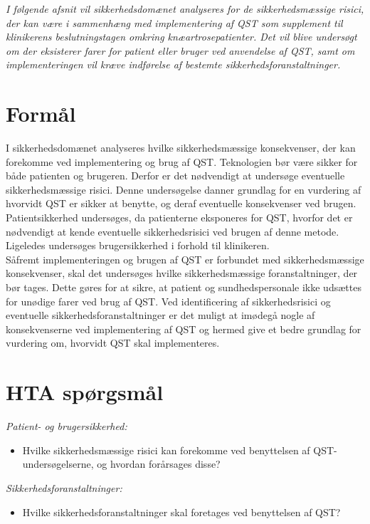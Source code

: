 \textit{I følgende afsnit vil sikkerhedsdomænet analyseres for de sikkerhedsmæssige risici, der kan være i sammenhæng med implementering af QST som supplement til klinikerens beslutningstagen omkring knæartrosepatienter. Det vil blive undersøgt om der eksisterer farer for patient eller bruger ved anvendelse af QST, samt om implementeringen vil kræve indførelse af bestemte sikkerhedsforanstaltninger.}

\section{Formål} \label{SAF_chap}
I sikkerhedsdomænet analyseres hvilke sikkerhedsmæssige konsekvenser, der kan forekomme ved implementering og brug af QST. Teknologien bør være sikker for både patienten og brugeren. Derfor er det nødvendigt at undersøge eventuelle sikkerhedsmæssige risici. Denne undersøgelse danner grundlag for en vurdering af hvorvidt QST er sikker at benytte, og deraf eventuelle konsekvenser ved brugen. \\
Patientsikkerhed undersøges, da patienterne eksponeres for QST, hvorfor det er nødvendigt at kende eventuelle sikkerhedsrisici ved brugen af denne metode. Ligeledes undersøges brugersikkerhed i forhold til klinikeren. \\
Såfremt implementeringen og brugen af QST er forbundet med sikkerhedsmæssige konsekvenser, skal det undersøges hvilke sikkerhedsmæssige foranstaltninger, der bør tages. Dette gøres for at sikre, at patient og sundhedspersonale ikke udsættes for unødige farer ved brug af QST. Ved identificering af sikkerhedsrisici og eventuelle sikkerhedsforanstaltninger er det muligt at imødegå nogle af konsekvenserne ved implementering af QST og hermed give et bedre grundlag for vurdering om, hvorvidt QST skal implementeres.
\section{HTA spørgsmål}
\textit{Patient- og brugersikkerhed:}
\begin{itemize}
\item Hvilke sikkerhedsmæssige risici kan forekomme ved benyttelsen af QST-undersøgelserne, og hvordan forårsages disse? %
\end{itemize}
\textit{Sikkerhedsforanstaltninger:}
\begin{itemize}
\item Hvilke sikkerhedsforanstaltninger skal foretages ved benyttelsen af QST?  %
\end{itemize}

